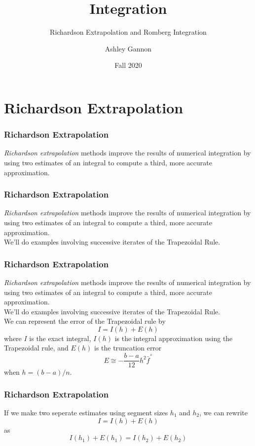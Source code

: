 \documentclass{if-beamer}
\title[Lecture 22]{Integration}
\subtitle{Richardson Extrapolation and Romberg Integration}
\author{Ashley Gannon}
\date{Fall 2020}
\begin{document}
\begin{frame}
  \titlepage
\end{frame}
\section{Richardson Extrapolation}

\begin{frame}[t]
\frametitle{Richardson Extrapolation}
\textit{Richardson extrapolation} methods improve the results of numerical integration by using two estimates of an integral to compute a third, more accurate approximation. \\\vspace{10pt}
\end{frame}

\begin{frame}[t]
	\frametitle{Richardson Extrapolation}
	\textit{Richardson extrapolation} methods improve the results of numerical integration by using two estimates of an integral to compute a third, more accurate approximation. \\\vspace{10pt}
	We'll do examples involving successive iterates of the Trapezoidal Rule. \\\vspace{10pt}
\end{frame}

\begin{frame}[t]
	\frametitle{Richardson Extrapolation}
	\textit{Richardson extrapolation} methods improve the results of numerical integration by using two estimates of an integral to compute a third, more accurate approximation. \\\vspace{10pt}
	We'll do examples involving successive iterates of the Trapezoidal Rule. \\\vspace{10pt}
	We can represent the error of the Trapezoidal rule by
	$$I = I(h) +E(h)$$
	where $I$ is the exact integral, $I(h)$ is the integral approximation using the Trapezoidal rule, and $E(h)$ is the truncation error
	$$ E \cong -\frac{b-a}{12}h^2\bar{f}^{''}$$ 
	when $h = (b-a)/n$.
\end{frame}


\begin{frame}[t]
	\frametitle{Richardson Extrapolation}
If we make two seperate estimates using segment sizes $h_1$ and $h_2$, we can rewrite
$$I = I(h) +E(h)$$
as 
$$I(h_1) +E(h_1) = I(h_2) +E(h_2)$$	
\end{frame}
\end{document}
